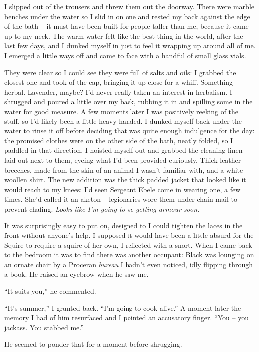 \documentclass[12pt, openany]{book}
\begin{document}
I slipped out of the trousers and threw them out the doorway. There were marble benches under the water so I slid in on one and rested my back against the edge of the bath – it must have been built for people taller than me, because it came up to my neck. The warm water felt like the best thing in the world, after the last few days, and I dunked myself in just to feel it wrapping up around all of me. I emerged a little ways off and came to face with a handful of small glass vials. 

They were clear so I could see they were full of salts and oils: I grabbed the closest one and took of the cap, bringing it up close for a whiff. Something herbal. Lavender, maybe? I’d never really taken an interest in herbalism. I shrugged and poured a little over my back, rubbing it in and spilling some in the water for good measure. A few moments later I was positively reeking of the stuff, so I’d likely been a little heavy-handed. I dunked myself back under the water to rinse it off before deciding that was quite enough indulgence for the day: the promised clothes were on the other side of the bath, neatly folded, so I paddled in that direction. I hoisted myself out and grabbed the cleaning linen laid out next to them, eyeing what I’d been provided curiously. Thick leather breeches, made from the skin of an animal I wasn’t familiar with, and a white woollen shirt. The new addition was the thick padded jacket that looked like it would reach to my knees: I’d seen Sergeant Ebele come in wearing one, a few times. She’d called it an aketon – legionaries wore them under chain mail to prevent chafing. \textit{Looks like I’m going to be getting armour soon.}

It was surprisingly easy to put on, designed to I could tighten the laces in the front without anyone’s help. I supposed it would have been a little absurd for the Squire to require a squire of her own, I reflected with a snort. When I came back to the bedroom it was to find there was another occupant: Black was lounging on an ornate chair by a Proceran \textit{bureau} I hadn’t even noticed, idly flipping through a book. He raised an eyebrow when he saw me.

“It suits you,” he commented.

“It’s summer,” I grunted back. “I’m going to cook alive.” A moment later the memory I had of him resurfaced and I pointed an accusatory finger. “You – you jackass. You stabbed me.”

He seemed to ponder that for a moment before shrugging.
\end{document}
